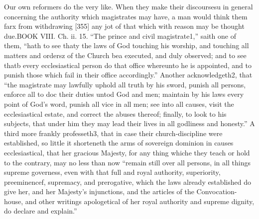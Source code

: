 Our own reformers do the very like. When they make their discoursesu in general concerning the authority which magistrates may have, a man would think them farx from withdrawing [355] any jot of that which with reason may be thought due.BOOK VIII. Ch. ii. 15. “The prince and civil magistrate1,” saith one of them, “hath to see thaty the laws of God touching his worship, and touching all matters and ordersz of the Church bea executed, and duly observed; and to see thatb every ecclesiastical person do that office whereunto he is appointed, and to punish those which fail in their office accordingly.” Another acknowledgeth2, that “the magistrate may lawfully uphold all truth by his sword, punish all persons, enforce all to doc their duties untod God and men; maintain by his laws every point of God’s word, punish all vice in all men; see into all causes, visit the ecclesiastical estate, and correct the abuses thereof; finally, to look to his subjects, that under him they may lead their lives in all godliness and honesty.” A third more frankly professeth3, that in case their church-discipline were established, so little it shorteneth the arms of sovereign dominion in causes ecclesiastical, that her gracious Majesty, for any thing whiche they teach or hold to the contrary, may no less than now “remain still over all persons, in all things supreme governess, even with that full and royal authority, superiority, preeminencef, supremacy, and prerogative, which the laws already established do give her, and her Majesty’s injunctions, and the articles of the Convocation-house, and other writings apologetical of her royal authority and supreme dignity, do declare and explain.”

